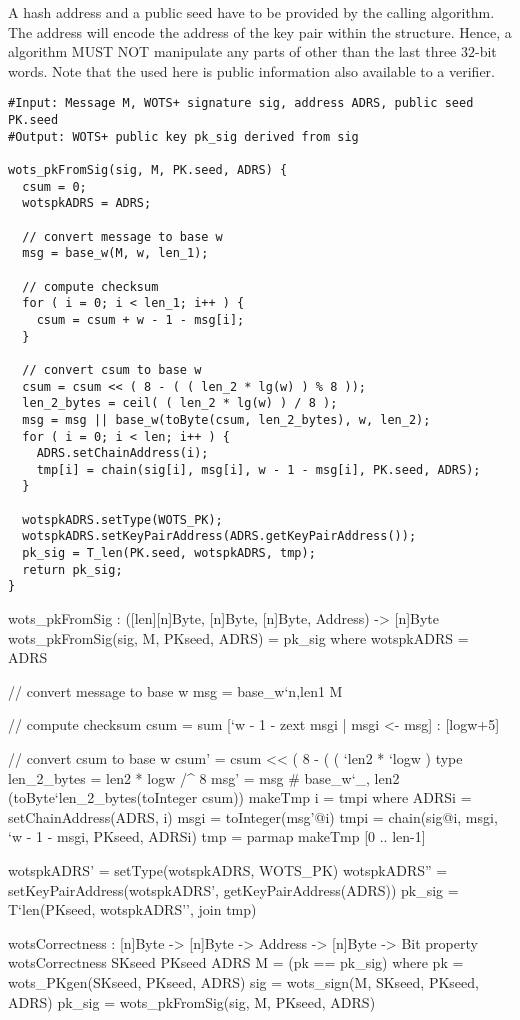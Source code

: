 A \wotsp hash address \adrs and a public seed \pseed have to be provided by the 
calling algorithm. The address will encode the address of the \wotsp key
pair within the \spx structure. Hence, a \wotsp algorithm MUST NOT
manipulate any parts of \adrs other than the last three $32$-bit words.
Note that the \pseed used here is public information also available to 
a verifier.

\begin{lstlisting}[label=alg:wots_pkfromsig, language=pseudoc,
                   caption=\texttt{wots\_pkFromSig} -- Computing a WOTS+ public key from a
                           message and its signature.]
#Input: Message M, WOTS+ signature sig, address ADRS, public seed PK.seed
#Output: WOTS+ public key pk_sig derived from sig 

wots_pkFromSig(sig, M, PK.seed, ADRS) {
  csum = 0;
  wotspkADRS = ADRS;

  // convert message to base w
  msg = base_w(M, w, len_1);

  // compute checksum
  for ( i = 0; i < len_1; i++ ) {
    csum = csum + w - 1 - msg[i];
  }

  // convert csum to base w
  csum = csum << ( 8 - ( ( len_2 * lg(w) ) % 8 ));
  len_2_bytes = ceil( ( len_2 * lg(w) ) / 8 );
  msg = msg || base_w(toByte(csum, len_2_bytes), w, len_2);
  for ( i = 0; i < len; i++ ) {
    ADRS.setChainAddress(i);
    tmp[i] = chain(sig[i], msg[i], w - 1 - msg[i], PK.seed, ADRS);
  }

  wotspkADRS.setType(WOTS_PK);
  wotspkADRS.setKeyPairAddress(ADRS.getKeyPairAddress());
  pk_sig = T_len(PK.seed, wotspkADRS, tmp);
  return pk_sig;
}
\end{lstlisting}

\begin{code}
  wots_pkFromSig : ([len][n]Byte, [n]Byte, [n]Byte, Address) -> [n]Byte
  wots_pkFromSig(sig, M, PKseed, ADRS) = pk_sig where
    wotspkADRS = ADRS

    // convert message to base w
    msg = base_w`{n,len1} M

    // compute checksum
    csum = sum [`w - 1 - zext msgi | msgi <- msg] : [logw+5]

    // convert csum to base w
    csum' = csum << ( 8 - ( ( `len2 * `logw ) %
    type len_2_bytes = len2 * logw /^ 8
    msg' = msg # base_w`{_, len2} (toByte`{len_2_bytes}(toInteger csum))
    makeTmp i = tmpi where
      ADRSi = setChainAddress(ADRS, i)
      msgi = toInteger(msg'@i)
      tmpi = chain(sig@i, msgi, `w - 1 - msgi, PKseed, ADRSi)
    tmp = parmap makeTmp [0 .. len-1]
    
    wotspkADRS' = setType(wotspkADRS, WOTS_PK)
    wotspkADRS'' = setKeyPairAddress(wotspkADRS', getKeyPairAddress(ADRS))
    pk_sig = T`{len}(PKseed, wotspkADRS'', join tmp)

  wotsCorrectness : [n]Byte -> [n]Byte -> Address -> [n]Byte -> Bit
  property wotsCorrectness SKseed PKseed ADRS M = (pk == pk_sig) where
    pk = wots_PKgen(SKseed, PKseed, ADRS)
    sig = wots_sign(M, SKseed, PKseed, ADRS)
    pk_sig = wots_pkFromSig(sig, M, PKseed, ADRS)
\end{code}

